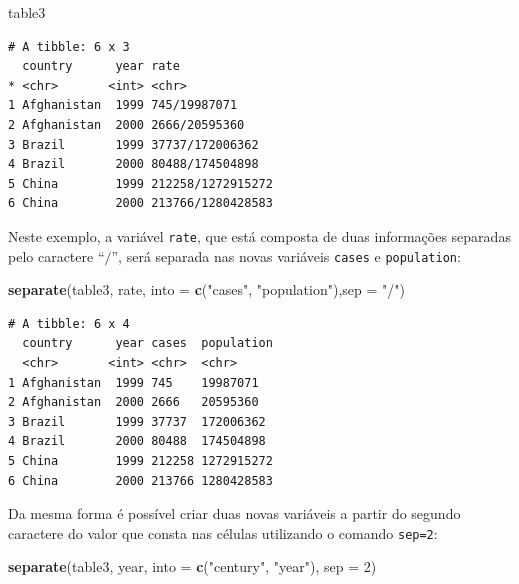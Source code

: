 \documentclass[12pt,brazil,oneside]{book}
\newenvironment{Shaded}{\begin{snugshade}}{\end{snugshade}}
\newcommand{\DataTypeTok}[1]{\textcolor[rgb]{0.13,0.29,0.53}{#1}}
\newcommand{\DecValTok}[1]{\textcolor[rgb]{0.00,0.00,0.81}{#1}}
\newcommand{\KeywordTok}[1]{\textcolor[rgb]{0.13,0.29,0.53}{\textbf{#1}}}
\newcommand{\NormalTok}[1]{#1}
\newcommand{\StringTok}[1]{\textcolor[rgb]{0.31,0.60,0.02}{#1}}
\begin{document}
\begin{Shaded}
\begin{Highlighting}[]
\NormalTok{table3}
\end{Highlighting}
\end{Shaded}

\begin{verbatim}
# A tibble: 6 x 3
  country      year rate             
* <chr>       <int> <chr>            
1 Afghanistan  1999 745/19987071     
2 Afghanistan  2000 2666/20595360    
3 Brazil       1999 37737/172006362  
4 Brazil       2000 80488/174504898  
5 China        1999 212258/1272915272
6 China        2000 213766/1280428583
\end{verbatim}

Neste exemplo, a variável \texttt{rate}, que está composta de duas informações separadas pelo caractere ``\(/\)'', será separada nas novas variáveis \texttt{cases} e \texttt{population}:

\begin{Shaded}
\begin{Highlighting}[]
\KeywordTok{separate}\NormalTok{(table3, rate, }\DataTypeTok{into =} \KeywordTok{c}\NormalTok{(}\StringTok{"cases"}\NormalTok{, }\StringTok{"population"}\NormalTok{),}\DataTypeTok{sep =} \StringTok{"/"}\NormalTok{)}
\end{Highlighting}
\end{Shaded}

\begin{verbatim}
# A tibble: 6 x 4
  country      year cases  population
  <chr>       <int> <chr>  <chr>     
1 Afghanistan  1999 745    19987071  
2 Afghanistan  2000 2666   20595360  
3 Brazil       1999 37737  172006362 
4 Brazil       2000 80488  174504898 
5 China        1999 212258 1272915272
6 China        2000 213766 1280428583
\end{verbatim}

Da mesma forma é possível criar duas novas variáveis a partir do segundo caractere do valor que consta nas células utilizando o comando \texttt{sep=2}:

\begin{Shaded}
\begin{Highlighting}[]
\KeywordTok{separate}\NormalTok{(table3, year, }\DataTypeTok{into =} \KeywordTok{c}\NormalTok{(}\StringTok{"century"}\NormalTok{, }\StringTok{"year"}\NormalTok{), }\DataTypeTok{sep =} \DecValTok{2}\NormalTok{)}
\end{Highlighting}
\end{Shaded}
\end{document}
